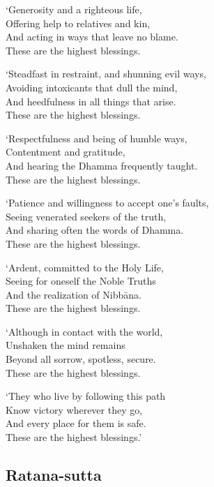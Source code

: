 `Generosity and a righteous life,\\
Offering help to relatives and kin,\\
And acting in ways that leave no blame.\\
These are the highest blessings.

`Steadfast in restraint, and shunning evil ways,\\
Avoiding intoxicants that dull the mind,\\
And heedfulness in all things that arise.\\
These are the highest blessings.

`Respectfulness and being of humble ways,\\
Contentment and gratitude,\\
And hearing the Dhamma frequently taught.\\
These are the highest blessings.

`Patience and willingness to accept one's faults,\\
Seeing venerated seekers of the truth,\\
And sharing often the words of Dhamma.\\
These are the highest blessings.

`Ardent, committed to the Holy Life,\\%
Seeing for oneself the Noble Truths\\
And the realization of Nibbāna.\\
These are the highest blessings.

`Although in contact with the world,\\
Unshaken the mind remains\\
Beyond all sorrow, spotless, secure.\\
These are the highest blessings.

`They who live by following this path\\
Know victory wherever they go,\\
And every place for them is safe.\\
These are the highest blessings.'


\subsection{Ratana-sutta}



